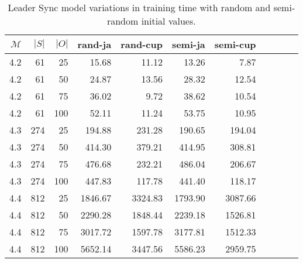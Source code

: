 \begin{table}
    \centering
    \caption{Leader Sync model variations in training time with random and semi-random initial values.}
    \label{tab:leader_results_rand_vs_semi}
    \begin{tabular}{rrrrrrrrrrr}
        \toprule
        $\mathcal{M}$ & $|S|$ & $|O|$ & rand-ja & rand-cup & semi-ja & semi-cup \\
        \midrule
        4.2           & 61    & 25    & 15.68   & 11.12    & 13.26   & 7.87     \\
        4.2           & 61    & 50    & 24.87   & 13.56    & 28.32   & 12.54    \\
        4.2           & 61    & 75    & 36.02   & 9.72     & 38.62   & 10.54    \\
        4.2           & 61    & 100   & 52.11   & 11.24    & 53.75   & 10.95    \\
        4.3           & 274   & 25    & 194.88  & 231.28   & 190.65  & 194.04   \\
        4.3           & 274   & 50    & 414.30  & 379.21   & 414.95  & 308.81   \\
        4.3           & 274   & 75    & 476.68  & 232.21   & 486.04  & 206.67   \\
        4.3           & 274   & 100   & 447.83  & 117.78   & 441.40  & 118.17   \\
        4.4           & 812   & 25    & 1846.67 & 3324.83  & 1793.90 & 3087.66  \\
        4.4           & 812   & 50    & 2290.28 & 1848.44  & 2239.18 & 1526.81  \\
        4.4           & 812   & 75    & 3017.72 & 1597.78  & 3177.81 & 1512.33  \\
        4.4           & 812   & 100   & 5652.14 & 3447.56  & 5586.23 & 2959.75  \\
        \bottomrule
    \end{tabular}
\end{table}
